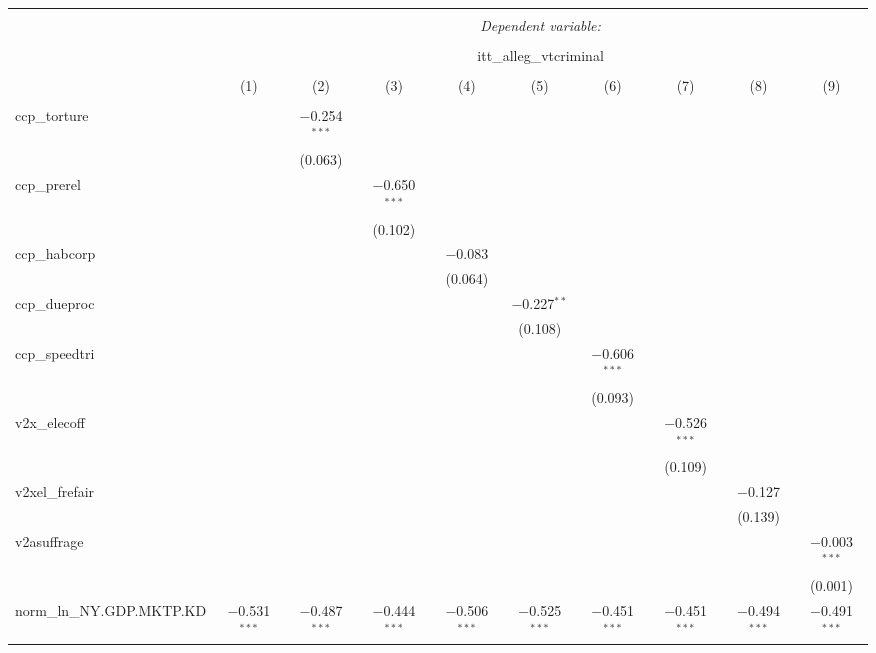
\begin{sidewaystable}[!htbp] \centering 
  \caption{} 
  \label{} 
\tiny 
\begin{tabular}{@{\extracolsep{5pt}}lccccccccc} 
\\[-1.8ex]\hline 
\hline \\[-1.8ex] 
 & \multicolumn{9}{c}{\textit{Dependent variable:}} \\ 
\cline{2-10} 
\\[-1.8ex] & \multicolumn{9}{c}{itt\_alleg\_vtcriminal} \\ 
\\[-1.8ex] & (1) & (2) & (3) & (4) & (5) & (6) & (7) & (8) & (9)\\ 
\hline \\[-1.8ex] 
 ccp\_torture &  & $-$0.254$^{***}$ &  &  &  &  &  &  &  \\ 
  &  & (0.063) &  &  &  &  &  &  &  \\ 
  ccp\_prerel &  &  & $-$0.650$^{***}$ &  &  &  &  &  &  \\ 
  &  &  & (0.102) &  &  &  &  &  &  \\ 
  ccp\_habcorp &  &  &  & $-$0.083 &  &  &  &  &  \\ 
  &  &  &  & (0.064) &  &  &  &  &  \\ 
  ccp\_dueproc &  &  &  &  & $-$0.227$^{**}$ &  &  &  &  \\ 
  &  &  &  &  & (0.108) &  &  &  &  \\ 
  ccp\_speedtri &  &  &  &  &  & $-$0.606$^{***}$ &  &  &  \\ 
  &  &  &  &  &  & (0.093) &  &  &  \\ 
  v2x\_elecoff &  &  &  &  &  &  & $-$0.526$^{***}$ &  &  \\ 
  &  &  &  &  &  &  & (0.109) &  &  \\ 
  v2xel\_frefair &  &  &  &  &  &  &  & $-$0.127 &  \\ 
  &  &  &  &  &  &  &  & (0.139) &  \\ 
  v2asuffrage &  &  &  &  &  &  &  &  & $-$0.003$^{***}$ \\ 
  &  &  &  &  &  &  &  &  & (0.001) \\ 
  norm\_ln\_NY.GDP.MKTP.KD & $-$0.531$^{***}$ & $-$0.487$^{***}$ & $-$0.444$^{***}$ & $-$0.506$^{***}$ & $-$0.525$^{***}$ & $-$0.451$^{***}$ & $-$0.451$^{***}$ & $-$0.494$^{***}$ & $-$0.491$^{***}$ \\ 

\end{tabular}
\end{sidewaystable}
